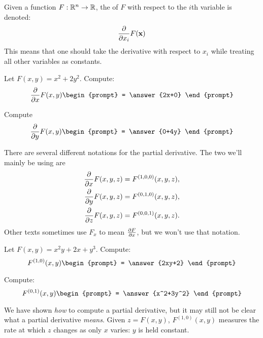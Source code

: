 \documentclass{ximera}
\begin{document}
\begin{definition}
  Given a function $F:\R^n\to\R$, the  of $F$
  with respect to the $i$th variable is denoted:
  \[
  \pp{x_i} F(\vec{x})
  \]
  This means that one should take the derivative with respect to $x_i$
  while treating all other variables as constants. 
\end{definition}

\begin{question}
  Let $F(x,y) = x^2+2y^2$. Compute:
  \[
  \pp{x} F(x,y)
  \begin{prompt}
    = \answer{2x+0}
  \end{prompt}
  \]
  \begin{question}
    Compute
  \[
  \pp{y} F(x,y)
  \begin{prompt}
    = \answer{0+4y}
  \end{prompt}
  \]
  \end{question}
\end{question}


\begin{definition}
  There are several different notations for the partial derivative.
  The two we'll mainly be using are
  \begin{align*}
    \pp{x} F(x,y,z) &= F^{(1,0,0)}(x,y,z),\\
    \pp{y} F(x,y,z) &= F^{(0,1,0)}(x,y,z),\\
    \pp{z} F(x,y,z) &= F^{(0,0,1)}(x,y,z).
  \end{align*}
  Other texts sometimes use $F_x$ to mean $\pp[F]{x}$, but we won't
  use that notation.
\end{definition}

\begin{question}
  Let $F(x,y) = x^2y + 2x+y^3$. Compute:
  \[
  F^{(1,0)}(x,y)
  \begin{prompt}
    = \answer{2xy+2}
  \end{prompt}
  \]
  \begin{question}
    Compute:
  \[
  F^{(0,1)}(x,y)
  \begin{prompt}
    = \answer{x^2+3y^2}
  \end{prompt}
  \]
  \end{question}
\end{question}

We have shown \textit{how} to compute a partial derivative, but it may
still not be clear what a partial derivative \textit{means}. Given
$z=F(x,y)$, $F^{(1,0)}(x,y)$ measures the rate at which $z$ changes as
only $x$ varies: $y$ is held constant. 
\end{document}
